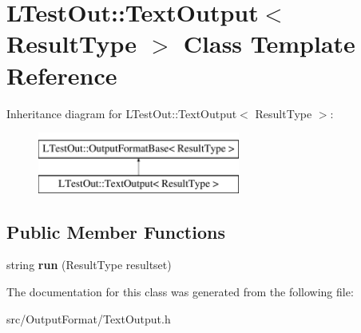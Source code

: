 \hypertarget{class_l_test_out_1_1_text_output}{\section{L\-Test\-Out\-:\-:Text\-Output$<$ Result\-Type $>$ Class Template Reference}
\label{class_l_test_out_1_1_text_output}
}
Inheritance diagram for L\-Test\-Out\-:\-:Text\-Output$<$ Result\-Type $>$\-:\begin{figure}[H]
\begin{center}
\leavevmode
\includegraphics[height=2.000000cm]{class_l_test_out_1_1_text_output}
\end{center}
\end{figure}
\subsection*{Public Member Functions}
\begin{DoxyCompactItemize}
\item 
\hypertarget{class_l_test_out_1_1_text_output_aa2906886f244081ea7889b2b1dc749b8}{string {\bfseries run} (Result\-Type resultset)}\label{class_l_test_out_1_1_text_output_aa2906886f244081ea7889b2b1dc749b8}

\end{DoxyCompactItemize}


The documentation for this class was generated from the following file\-:\begin{DoxyCompactItemize}
\item 
src/\-Output\-Format/Text\-Output.\-h\end{DoxyCompactItemize}
